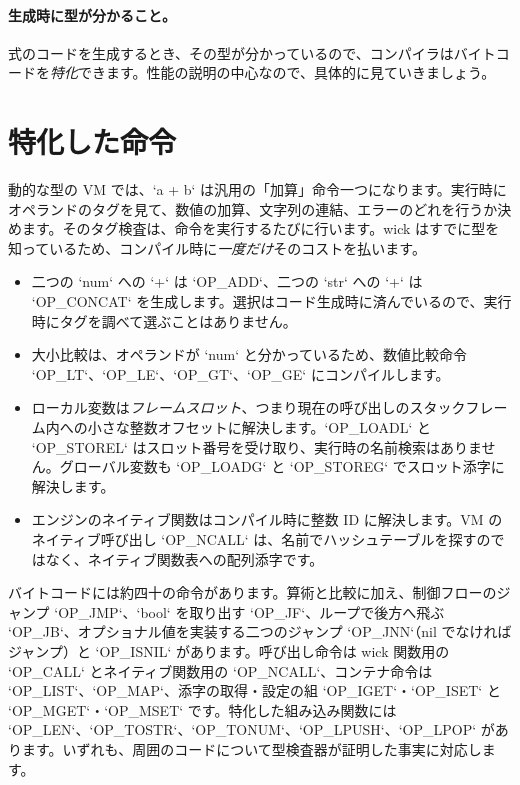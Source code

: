 \paragraph{生成時に型が分かること。} 式のコードを生成するとき、その型が分かっているので、コンパイラはバイトコードを\emph{特化}できます。性能の説明の中心なので、具体的に見ていきましょう。

\section{特化した命令}

動的な型の VM では、`a + b` は汎用の「加算」命令一つになります。実行時にオペランドのタグを見て、数値の加算、文字列の連結、エラーのどれを行うか決めます。そのタグ検査は、命令を実行するたびに行います。wick はすでに型を知っているため、コンパイル時に\emph{一度だけ}そのコストを払います。

\begin{itemize}
\item 二つの `num` への `+` は `OP_ADD`、二つの `str` への `+` は `OP_CONCAT` を生成します。選択はコード生成時に済んでいるので、実行時にタグを調べて選ぶことはありません。
\item 大小比較は、オペランドが `num` と分かっているため、数値比較命令 `OP_LT`、`OP_LE`、`OP_GT`、`OP_GE` にコンパイルします。
\item ローカル変数は\emph{フレームスロット}、つまり現在の呼び出しのスタックフレーム内への小さな整数オフセットに解決します。`OP_LOADL` と `OP_STOREL` はスロット番号を受け取り、実行時の名前検索はありません。グローバル変数も `OP_LOADG` と `OP_STOREG` でスロット添字に解決します。
\item エンジンのネイティブ関数はコンパイル時に整数 ID に解決します。VM のネイティブ呼び出し `OP_NCALL` は、名前でハッシュテーブルを探すのではなく、ネイティブ関数表への配列添字です。
\end{itemize}

\noindent
バイトコードには約四十の命令があります。算術と比較に加え、制御フローのジャンプ `OP_JMP`、`bool` を取り出す `OP_JF`、ループで後方へ飛ぶ `OP_JB`、オプショナル値を実装する二つのジャンプ `OP_JNN`（nil でなければジャンプ）と `OP_ISNIL` があります。呼び出し命令は wick 関数用の `OP_CALL` とネイティブ関数用の `OP_NCALL`、コンテナ命令は `OP_LIST`、`OP_MAP`、添字の取得・設定の組 `OP_IGET`・`OP_ISET` と `OP_MGET`・`OP_MSET` です。特化した組み込み関数には `OP_LEN`、`OP_TOSTR`、`OP_TONUM`、`OP_LPUSH`、`OP_LPOP` があります。いずれも、周囲のコードについて型検査器が証明した事実に対応します。

